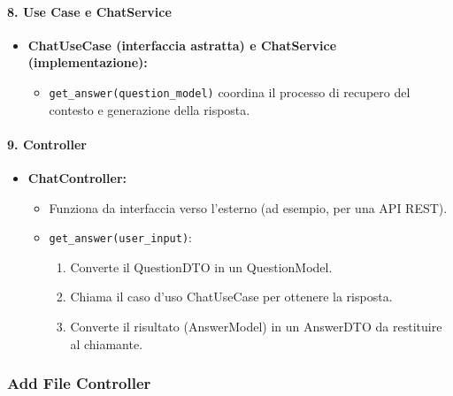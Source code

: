     \paragraph{8. Use Case e ChatService}
    \begin{itemize}
        \item \textbf{ChatUseCase (interfaccia astratta) e ChatService (implementazione):}
        \begin{itemize}
            \item \texttt{get\_answer(question\_model)} coordina il processo di recupero del contesto e generazione della risposta.
        \end{itemize}
    \end{itemize}

    \paragraph{9. Controller}
    \begin{itemize}
        \item \textbf{ChatController:}
        \begin{itemize}
            \item Funziona da interfaccia verso l’esterno (ad esempio, per una API REST).
            \item \texttt{get\_answer(user\_input)}:
            \begin{enumerate}
                \item Converte il QuestionDTO in un QuestionModel.
                \item Chiama il caso d’uso ChatUseCase per ottenere la risposta.
                \item Converte il risultato (AnswerModel) in un AnswerDTO da restituire al chiamante.
            \end{enumerate}
        \end{itemize}
    \end{itemize}

    \subsubsection{Add File Controller}

